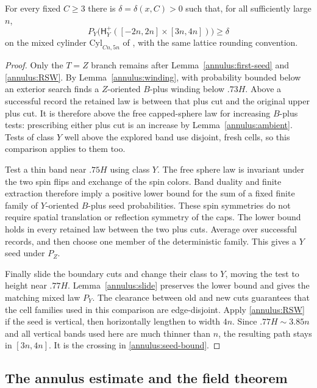 \begin{proposition}
\label{annulus:seed}
For every fixed $C\geq3$ there is $\delta=\delta(x,C)>0$ such that,
for all sufficiently large $n$,
\begin{equation}\label{annulus:seed-bound}
 P_Y\bigl(\mathsf H_Y^+([-2n,2n]\times[3n,4n])\bigr)\geq\delta
\end{equation}
on the mixed cylinder $\mathrm{Cyl}_{Cn,5n}$ of
\cite[Appendix~A]{GL2025}, with the same lattice rounding convention.
\end{proposition}
\begin{proof}
Only the $T=Z$ branch remains after Lemma~\ref{annulus:first-seed}
and \eqref{annulus:RSW}.  By Lemma~\ref{annulus:winding}, with
probability bounded below an exterior search finds a $Z$-oriented
$B$-plus winding below $.73H$.  Above a successful record the retained
law is between that plus cut and the original upper plus cut.  It is
therefore above the free capped-sphere law for increasing $B$-plus
tests: prescribing either plus cut is an increase by
Lemma~\ref{annulus:ambient}.  Tests of class $Y$ well above the
explored band use disjoint, fresh cells, so this comparison applies to
them too.

Test a thin band near $.75H$ using class $Y$.  The free sphere law is
invariant under the two spin flips and exchange of the spin colors.
Band duality and finite extraction therefore imply a positive lower
bound for the sum of a fixed finite family of $Y$-oriented $B$-plus
seed probabilities.  These spin symmetries do not require spatial
translation or reflection symmetry of the caps.  The lower bound holds
in every retained law between the two plus cuts.  Average over
successful records, and then choose one member of the deterministic
family.  This gives a $Y$ seed under $P_Z$.

Finally slide the boundary cuts and change their class to $Y$, moving
the test to height near $.77H$.  Lemma~\ref{annulus:slide} preserves
the lower bound and gives the matching mixed law $P_Y$.  The clearance
between old and new cuts guarantees that the cell families used in
this comparison are edge-disjoint.  Apply \eqref{annulus:RSW} if the
seed is vertical, then horizontally lengthen to width $4n$.  Since
$.77H\sim3.85n$ and all vertical bands used here are much thinner than
$n$, the resulting path stays in $[3n,4n]$.  It is the crossing in
\eqref{annulus:seed-bound}.
\end{proof}

\subsection{The annulus estimate and the field theorem}

